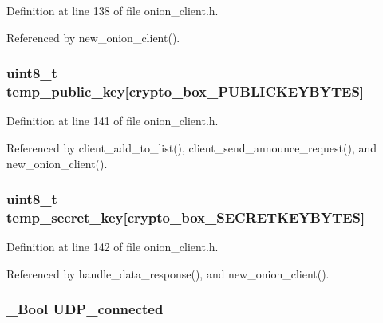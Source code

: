 Definition at line 138 of file onion\+\_\+client.\+h.



Referenced by new\+\_\+onion\+\_\+client().

\hypertarget{struct_onion___client_afc342de3f1533c0adfd762a6fd0d20ab}{
\subsubsection[{temp\+\_\+public\+\_\+key}]{\setlength{\rightskip}{0pt plus 5cm}uint8\+\_\+t temp\+\_\+public\+\_\+key\mbox{[}crypto\+\_\+box\+\_\+\+P\+U\+B\+L\+I\+C\+K\+E\+Y\+B\+Y\+T\+E\+S\mbox{]}}}\label{struct_onion___client_afc342de3f1533c0adfd762a6fd0d20ab}


Definition at line 141 of file onion\+\_\+client.\+h.



Referenced by client\+\_\+add\+\_\+to\+\_\+list(), client\+\_\+send\+\_\+announce\+\_\+request(), and new\+\_\+onion\+\_\+client().

\hypertarget{struct_onion___client_a6de303feb7b7892cc6a38228554b3e78}{
\subsubsection[{temp\+\_\+secret\+\_\+key}]{\setlength{\rightskip}{0pt plus 5cm}uint8\+\_\+t temp\+\_\+secret\+\_\+key\mbox{[}crypto\+\_\+box\+\_\+\+S\+E\+C\+R\+E\+T\+K\+E\+Y\+B\+Y\+T\+E\+S\mbox{]}}}\label{struct_onion___client_a6de303feb7b7892cc6a38228554b3e78}


Definition at line 142 of file onion\+\_\+client.\+h.



Referenced by handle\+\_\+data\+\_\+response(), and new\+\_\+onion\+\_\+client().

\hypertarget{struct_onion___client_ab561b9f2ae6e811457653ddacc1e7f6c}{
\subsubsection[{U\+D\+P\+\_\+connected}]{\setlength{\rightskip}{0pt plus 5cm}\+\_\+\+Bool U\+D\+P\+\_\+connected}}\label{struct_onion___client_ab561b9f2ae6e811457653ddacc1e7f6c}


